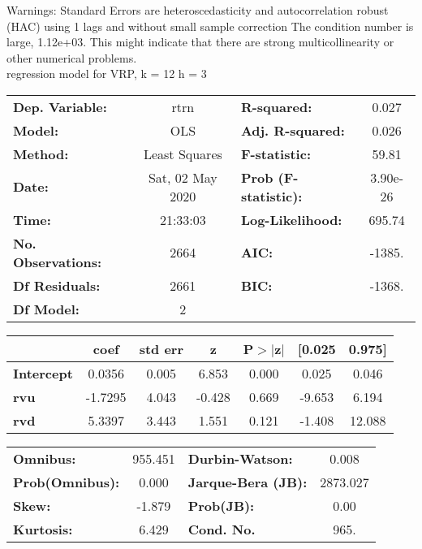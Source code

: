 Warnings: \newline
 [1] Standard Errors are heteroscedasticity and autocorrelation robust (HAC) using 1 lags and without small sample correction \newline
 [2] The condition number is large, 1.12e+03. This might indicate that there are \newline
 strong multicollinearity or other numerical problems.\\ 

regression model for VRP, k = 12 h = 3\begin{center}
\begin{tabular}{lclc}
\toprule
\textbf{Dep. Variable:}    &       rtrn       & \textbf{  R-squared:         } &     0.027   \\
\textbf{Model:}            &       OLS        & \textbf{  Adj. R-squared:    } &     0.026   \\
\textbf{Method:}           &  Least Squares   & \textbf{  F-statistic:       } &     59.81   \\
\textbf{Date:}             & Sat, 02 May 2020 & \textbf{  Prob (F-statistic):} &  3.90e-26   \\
\textbf{Time:}             &     21:33:03     & \textbf{  Log-Likelihood:    } &    695.74   \\
\textbf{No. Observations:} &        2664      & \textbf{  AIC:               } &    -1385.   \\
\textbf{Df Residuals:}     &        2661      & \textbf{  BIC:               } &    -1368.   \\
\textbf{Df Model:}         &           2      & \textbf{                     } &             \\
\bottomrule
\end{tabular}
\begin{tabular}{lcccccc}
                   & \textbf{coef} & \textbf{std err} & \textbf{z} & \textbf{P$> |$z$|$} & \textbf{[0.025} & \textbf{0.975]}  \\
\midrule
\textbf{Intercept} &       0.0356  &        0.005     &     6.853  &         0.000        &        0.025    &        0.046     \\
\textbf{rvu}       &      -1.7295  &        4.043     &    -0.428  &         0.669        &       -9.653    &        6.194     \\
\textbf{rvd}       &       5.3397  &        3.443     &     1.551  &         0.121        &       -1.408    &       12.088     \\
\bottomrule
\end{tabular}
\begin{tabular}{lclc}
\textbf{Omnibus:}       & 955.451 & \textbf{  Durbin-Watson:     } &    0.008  \\
\textbf{Prob(Omnibus):} &   0.000 & \textbf{  Jarque-Bera (JB):  } & 2873.027  \\
\textbf{Skew:}          &  -1.879 & \textbf{  Prob(JB):          } &     0.00  \\
\textbf{Kurtosis:}      &   6.429 & \textbf{  Cond. No.          } &     965.  \\
\bottomrule
\end{tabular}
\end{center}

